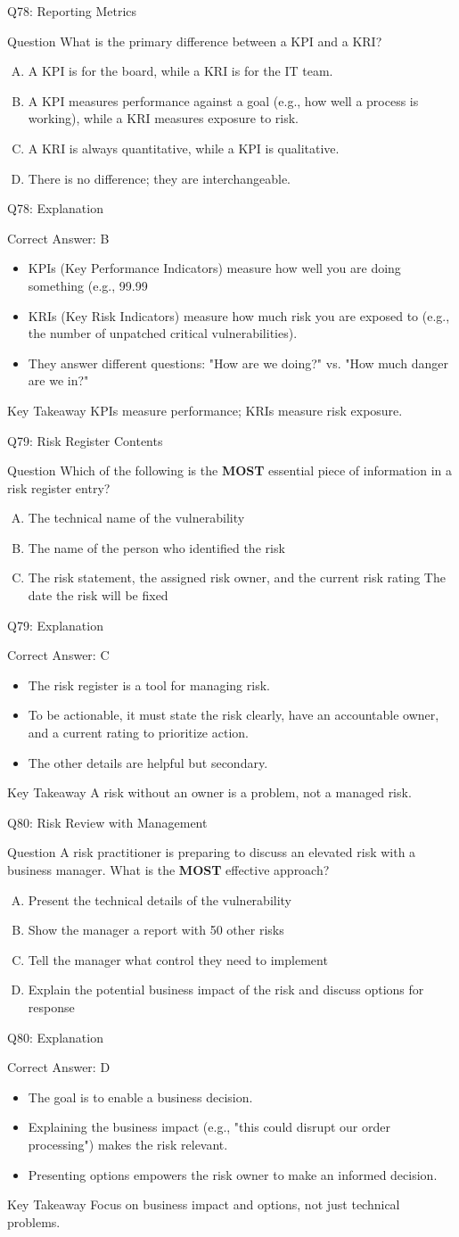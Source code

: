 \documentclass[aspectratio=169]{beamer}
\newcommand{\hq}[7]{%
	\begin{frame}{Q#1: #2}
		\begin{block}{Question}
			#3
		\end{block}
		\begin{enumerate}[(A)]
			#4
		\end{enumerate}
	\end{frame}
	\begin{frame}{Q#1: Explanation}
		\begin{block}{Correct Answer: #5}
			\begin{itemize}
				#6
			\end{itemize}
		\end{block}
		\begin{alertblock}{Key Takeaway}
			#7
		\end{alertblock}
	\end{frame}
}
\begin{document}
{		\hq{78}{Reporting Metrics}
		{What is the primary difference between a KPI and a KRI?}
		{\item A KPI is for the board, while a KRI is for the IT team.
			\item A KPI measures performance against a goal (e.g., how well a process is working), while a KRI measures exposure to risk.
			\item A KRI is always quantitative, while a KPI is qualitative.
			\item There is no difference; they are interchangeable.}
		{B}
		{\item KPIs (Key Performance Indicators) measure how well you are doing something (e.g., 99.99%
			\item KRIs (Key Risk Indicators) measure how much risk you are exposed to (e.g., the number of unpatched critical vulnerabilities).
			\item They answer different questions: "How are we doing?" vs. "How much danger are we in?"}
		{KPIs measure performance; KRIs measure risk exposure.}
		
		\hq{79}{Risk Register Contents}
		{Which of the following is the \textbf{MOST} essential piece of information in a risk register entry?}
		{\item The technical name of the vulnerability
			\item The name of the person who identified the risk
			\item The risk statement, the assigned risk owner, and the current risk rating
			\ditem The date the risk will be fixed}
		{C}
		{\item The risk register is a tool for managing risk.
			\item To be actionable, it must state the risk clearly, have an accountable owner, and a current rating to prioritize action.
			\item The other details are helpful but secondary.}
		{A risk without an owner is a problem, not a managed risk.}
		
		\hq{80}{Risk Review with Management}
		{A risk practitioner is preparing to discuss an elevated risk with a business manager. What is the \textbf{MOST} effective approach?}
		{\item Present the technical details of the vulnerability
			\item Show the manager a report with 50 other risks
			\item Tell the manager what control they need to implement
			\item Explain the potential business impact of the risk and discuss options for response}
		{D}
		{\item The goal is to enable a business decision.
			\item Explaining the business impact (e.g., "this could disrupt our order processing") makes the risk relevant.
			\item Presenting options empowers the risk owner to make an informed decision.}
		{Focus on business impact and options, not just technical problems.}
		
}
\end{document}
